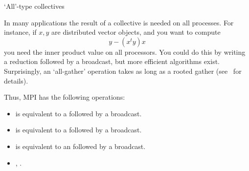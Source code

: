 





 {`All'-type collectives}

In many applications the result of a collective is needed on all processes.
For instance, if $x,y$ are distributed vector objects, and you want to compute
\[ y- (x^ty)x \]
you need the inner product value on all processors. You could do this
by writing a reduction followed by a broadcast, but more efficient
algorithms exist.  Surprisingly, an `all-gather' operation takes as
long as a rooted gather (see~ for details).

Thus, MPI has the following operations:
\begin{itemize}
\item {} is equivalent to a  followed by a broadcast.
\item {} is equivalent to a  followed by a broadcast.
\item {} is equivalent to an  followed by a broadcast.
\item {}, .
\end{itemize}

